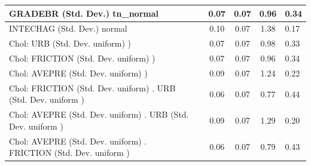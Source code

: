 \begin{table}
\begin{center}
\begin{tabular}{|l|l|c|c|c|l|}
			\hline
			GRADEBR (Std. Dev.) tn_normal &  & 0.07 & 0.07 & 0.96 & 0.34 \\
			\hline
			INTECHAG (Std. Dev.) normal &  & 0.10 & 0.07 & 1.38 & 0.17 \\
			\hline
			 Chol: URB (Std. Dev. uniform) ) &  & 0.07 & 0.07 & 0.98 & 0.33 \\
			\hline
			 Chol: FRICTION (Std. Dev. uniform) ) &  & 0.07 & 0.07 & 0.96 & 0.34 \\
			\hline
			 Chol: AVEPRE (Std. Dev. uniform) ) &  & 0.09 & 0.07 & 1.24 & 0.22 \\
			\hline
			 Chol: FRICTION (Std. Dev. uniform) . URB (Std. Dev.   uniform ) &  & 0.06 & 0.07 & 0.77 & 0.44 \\
			\hline
			 Chol: AVEPRE (Std. Dev. uniform) . URB (Std. Dev.   uniform ) &  & 0.09 & 0.07 & 1.29 & 0.20 \\
			\hline
			 Chol: AVEPRE (Std. Dev. uniform) . FRICTION (Std. Dev.   uniform ) &  & 0.06 & 0.07 & 0.79 & 0.43 \\
			\hline
		\end{tabular}
	\end{center}
\end{table}